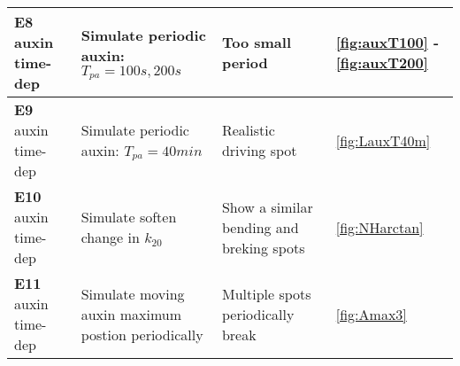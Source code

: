 \begin{table}[H]
\begin{tabular}{|p{3cm} |l l p{3cm}|}
    \hline
    \textbf{E8} auxin time-dep & \parbox[t]{4cm}{Simulate \\ periodic auxin: \\ $T_{pa} = 100s, 200s $} & \parbox[t]{4cm}{Too small period} & \ref{fig:auxT100} - \ref{fig:auxT200} \T\B\\
    \hline
    \textbf{E9} auxin time-dep & \parbox[t]{4cm}{Simulate \\ periodic auxin: \\ $T_{pa} = 40 min$} & \parbox[t]{4cm} {Realistic driving spot} & \ref{fig:LauxT40m} \T\B\\
    \hline
    \textbf{E10} auxin time-dep & \parbox[t]{4cm}{Simulate \\ soften change in $k_{20}$} & \parbox[t]{4cm}{Show a similar bending and breking spots} & \ref{fig:NHarctan} \T\B\\
    \hline
    \textbf{E11} auxin time-dep & \parbox[t]{4cm}{Simulate moving \\ auxin maximum \\ postion periodically \T\B} & \parbox[t]{4cm}{Multiple spots  periodically break} & \ref{fig:Amax3} \T\B\\
    \hline
    \end{tabular}
    \\[10pt]
    \caption[Table summarizing RR results on 2 cells system]{}
    \label{table:summaryRes}
\end{table}

